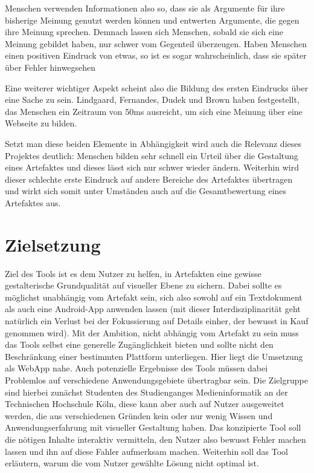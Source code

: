 Menschen verwenden Informationen also so, dass sie als Argumente für ihre bisherige Meinung genutzt werden können und entwerten Argumente, die gegen ihre Meinung sprechen. Demnach lassen sich Menschen, sobald sie sich eine Meinung gebildet haben, nur schwer vom Gegenteil überzeugen.
Haben Menschen einen positiven Eindruck von etwas, so ist es sogar wahrscheinlich, dass sie später über Fehler hinwegsehen \cite{campbell1996fitting}

Eine weiterer wichtiger Aspekt scheint also die Bildung des ersten Eindrucks über eine Sache zu sein. Lindgaard, Fernandes, Dudek und Brown haben festgestellt, das Menschen ein Zeitraum von 50ms ausreicht, um sich eine Meinung über eine Webseite zu bilden. \cite{lindgaard2006attention}

Setzt man diese beiden Elemente in Abhängigkeit wird auch die Relevanz dieses Projektes deutlich: Menschen bilden sehr schnell ein Urteil über die Gestaltung eines Artefaktes und dieses lässt sich nur schwer wieder ändern. Weiterhin wird dieser schlechte erste Eindruck auf andere Bereiche des Artefaktes übertragen und wirkt sich somit unter Umständen auch auf die Gesamtbewertung eines Artefaktes aus.


\section{Zielsetzung}
Ziel des Tools ist es dem Nutzer zu helfen,  in Artefakten eine gewisse gestalterische Grundqualität auf visueller Ebene zu sichern. Dabei sollte es möglichst unabhängig vom Artefakt sein, sich also sowohl auf ein Textdokument als auch eine Android-App anwenden lassen (mit dieser Interdisziplinarität geht natürlich ein Verlust bei der Fokussierung auf Details einher, der bewusst in Kauf genommen wird).
Mit der Ambition, nicht abhängig vom Artefakt zu sein muss das Tools selbst eine generelle Zugänglichkeit bieten und sollte nicht den Beschränkung einer bestimmten Plattform unterliegen. Hier liegt die Umsetzung als WebApp nahe. Auch potenzielle Ergebnisse des Tools müssen dabei Problemlos auf verschiedene Anwendungsgebiete übertragbar sein.
Die Zielgruppe sind hierbei zunächst Studenten des Studienganges Medieninformatik an der Technischen Hochschule Köln, diese kann aber auch auf Nutzer ausgeweitet werden, die aus verschiedenen Gründen kein oder nur wenig Wissen und Anwendungserfahrung mit visueller Gestaltung haben.
Das konzipierte Tool soll die nötigen Inhalte interaktiv vermitteln, den Nutzer also bewusst Fehler machen lassen und ihn auf diese Fahler aufmerksam machen. Weiterhin soll das Tool erläutern, warum die vom Nutzer gewählte Lösung nicht optimal ist.

